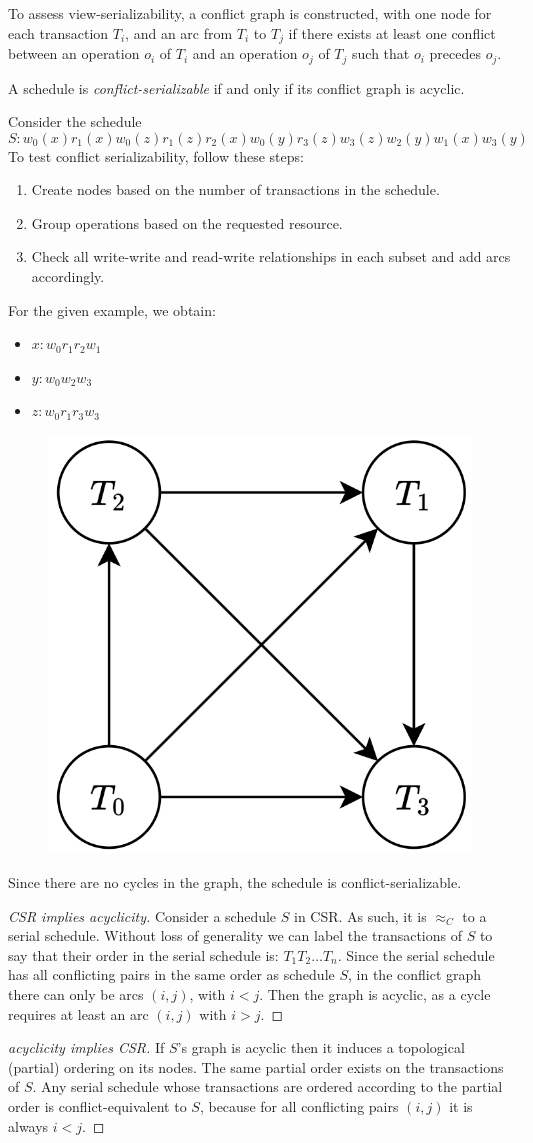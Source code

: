 To assess view-serializability, a conflict graph is constructed, with one node for each transaction $T_i$, and an arc from $T_i$ to $T_j$ if there exists at least one conflict between an operation $o_i$ of $T_i$ and an operation $o_j$ of $T_j$ such that $o_i$ precedes $o_j$.
\begin{theorem}
    A schedule is \emph{conflict-serializable} if and only if its conflict graph is acyclic.
\end{theorem}
\begin{example}
    Consider the schedule 
    \[S: w_0(x) r_1(x) w_0(z) r_1(z) r_2(x) w_0(y) r_3(z) w_3(z) w_2(y) w_1(x) w_3(y)\]
    To test conflict serializability, follow these steps:
    \begin{enumerate}
        \item Create nodes based on the number of transactions in the schedule.
        \item Group operations based on the requested resource.
        \item Check all write-write and read-write relationships in each subset and add arcs accordingly. 
    \end{enumerate}
    For the given example, we obtain:
    \begin{itemize}
        \item $x: w_0 r_1 r_2 w_1$
        \item $y: w_0 w_2 w_3$
        \item $z: w_0 r_1 r_3 w_3$
    \end{itemize}
    \begin{figure}[H]
        \centering
        \includegraphics[width=0.25\linewidth]{images/conflict.png}
    \end{figure}
    Since there are no cycles in the graph, the schedule is conflict-serializable.
\end{example}
\begin{proof}[CSR implies acyclicity]
    Consider a schedule $S$ in CSR. 
    As such, it is $\approx_C$ to a serial schedule. 
    Without loss of generality we can label the transactions of $S$ to say that their order in the serial schedule is: $T_1 T_2 \dots T_n$.
    Since the serial schedule has all conflicting pairs in the same order as schedule $S$, in the conflict graph there can only be arcs $(i,j)$, with $i<j$. 
    Then the graph is acyclic, as a cycle requires at least an arc $(i,j)$ with $i>j$.
\end{proof}
\begin{proof}[acyclicity implies CSR]
    If $S$'s graph is acyclic then it induces a topological (partial) ordering on its nodes. 
    The same partial order exists on the transactions of $S$. 
    Any serial schedule whose transactions are ordered according to the partial order is conflict-equivalent to $S$, because for all conflicting pairs $(i,j)$ it is always $i<j$. 
\end{proof}